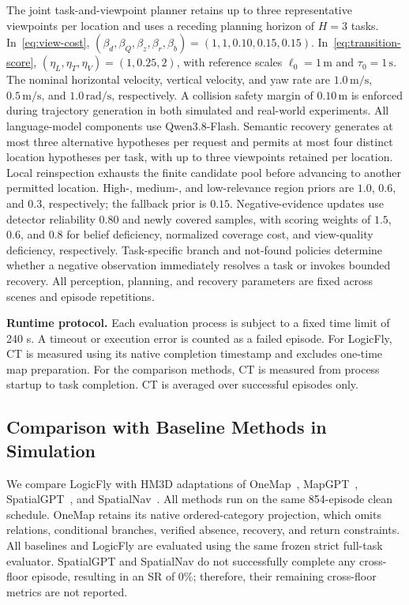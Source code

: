 \documentclass[letterpaper,10pt,journal]{IEEEtran}
\begin{document}
The joint task-and-viewpoint planner retains up to three representative viewpoints per location and uses a receding planning horizon of $H=3$ tasks. In~\eqref{eq:view-cost}, $(\beta_d,\beta_Q,\beta_z,\beta_r,\beta_b)=(1,1,0.10,0.15,0.15)$. In~\eqref{eq:transition-score}, $(\eta_L,\eta_T,\eta_V)=(1,0.25,2)$, with reference scales $\ell_0=1\,\mathrm{m}$ and $\tau_0=1\,\mathrm{s}$. The nominal horizontal velocity, vertical velocity, and yaw rate are $1.0\,\mathrm{m/s}$, $0.5\,\mathrm{m/s}$, and $1.0\,\mathrm{rad/s}$, respectively. A collision safety margin of $0.10\,\mathrm{m}$ is enforced during trajectory generation in both simulated and real-world experiments. All language-model components use Qwen3.8-Flash. Semantic recovery generates at most three alternative hypotheses per request and permits at most four distinct location hypotheses per task, with up to three viewpoints retained per location. Local reinspection exhausts the finite candidate pool before advancing to another permitted location. High-, medium-, and low-relevance region priors are $1.0$, $0.6$, and $0.3$, respectively; the fallback prior is $0.15$. Negative-evidence updates use detector reliability $0.80$ and newly covered samples, with scoring weights of $1.5$, $0.6$, and $0.8$ for belief deficiency, normalized coverage cost, and view-quality deficiency, respectively. Task-specific branch and not-found policies determine whether a negative observation immediately resolves a task or invokes bounded recovery. All perception, planning, and recovery parameters are fixed across scenes and episode repetitions.

\textbf{Runtime protocol.}
Each evaluation process is subject to a fixed time limit of 240 s. A timeout or execution error is counted as a failed episode. For LogicFly, CT is measured using its native completion timestamp and excludes one-time map preparation. For the comparison methods, CT is measured from process startup to task completion. CT is averaged over successful episodes only.

\subsection{Comparison with Baseline Methods in Simulation}
We compare LogicFly with HM3D adaptations of OneMap~\cite{busch2025onemap}, MapGPT~\cite{chen2024mapgpt}, SpatialGPT~\cite{jiang2025spatialgpt}, and SpatialNav~\cite{zhang2026spatialnav}. All methods run on the same 854-episode clean schedule. OneMap retains its native ordered-category projection, which omits relations, conditional branches, verified absence, recovery, and return constraints. All baselines and LogicFly are evaluated using the same frozen strict full-task evaluator. SpatialGPT and SpatialNav do not successfully complete any cross-floor episode, resulting in an SR of 0\%; therefore, their remaining cross-floor metrics are not reported.
\end{document}
